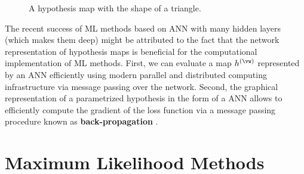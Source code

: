 \documentclass[12pt]{report}
\begin{document}
\begin{figure}[htbp]
\begin{center}
     \vspace*{-10mm}
\end{center}
\caption{A hypothesis map with the shape of a triangle.}
\label{fig_triangle}
\end{figure}

The recent success of ML methods based on ANN with many hidden layers 
(which makes them deep) might be attributed to the fact that the network 
representation of hypothesis maps is beneficial for the computational 
implementation of ML methods. First, we can evaluate a map $h^{(\vw)}$ represented 
by an ANN efficiently using modern parallel and distributed computing 
infrastructure via message passing over the network. Second, the 
graphical representation of a parametrized hypothesis in the form 
of a ANN allows to efficiently compute the gradient of the loss function via a message passing 
procedure known as {\bf back-propagation} \cite{Goodfellow-et-al-2016}.

\section{Maximum Likelihood Methods}
\label{sec_max_iikelihood}
\end{document}

